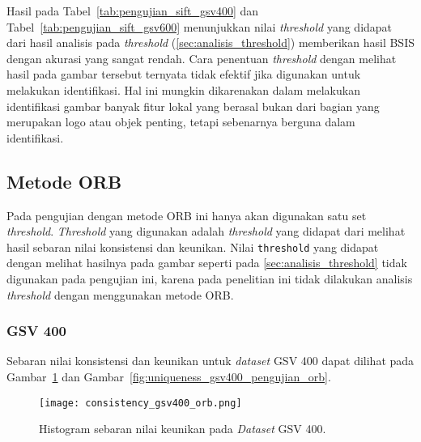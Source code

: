 Hasil pada Tabel~\ref{tab:pengujian_sift_gsv400} dan Tabel~\ref{tab:pengujian_sift_gsv600} menunjukkan nilai \textit{threshold} yang didapat dari hasil analisis pada \textit{threshold} (\ref{sec:analisis_threshold}) memberikan hasil BSIS dengan akurasi yang sangat rendah. Cara penentuan \textit{threshold} dengan melihat hasil pada gambar tersebut ternyata tidak efektif jika digunakan untuk melakukan identifikasi. Hal ini mungkin dikarenakan dalam melakukan identifikasi gambar banyak fitur lokal yang berasal bukan dari bagian yang merupakan logo atau objek penting, tetapi sebenarnya berguna dalam identifikasi.

\subsection{Metode ORB}
Pada pengujian dengan metode ORB ini hanya akan digunakan satu set \textit{threshold}. \textit{Threshold} yang digunakan adalah \textit{threshold} yang didapat dari melihat hasil sebaran nilai konsistensi dan keunikan. Nilai \texttt{threshold} yang didapat dengan melihat hasilnya pada gambar seperti pada \ref{sec:analisis_threshold} tidak digunakan pada pengujian ini, karena pada penelitian ini tidak dilakukan analisis \textit{threshold} dengan menggunakan metode ORB. 

\subsubsection{GSV 400}
Sebaran nilai konsistensi dan keunikan untuk \textit{dataset} GSV 400 dapat dilihat pada Gambar~\ref{fig:consistency_gsv400_pengujian_orb} dan Gambar~\ref{fig:uniqueness_gsv400_pengujian_orb}.
\begin{figure}[H]
	\centering
	\texttt{[image: consistency\_gsv400\_orb.png]}
	\caption{Histogram sebaran nilai keunikan pada \textit{Dataset} GSV 400.}
	\label{fig:consistency_gsv400_pengujian_orb}
\end{figure}

